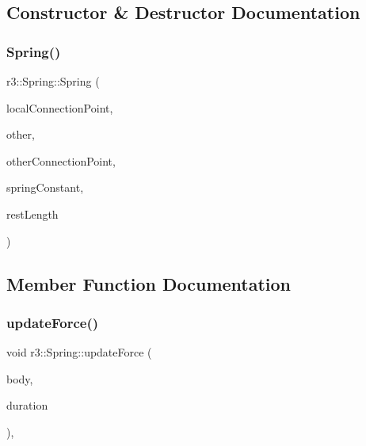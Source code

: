 \subsection{Constructor \& Destructor Documentation}
\mbox{\label{classr3_1_1_spring_ae96ec521b5609d2ace1476aec3c831f3}} 
\subsubsection{\texorpdfstring{Spring()}{Spring()}}
{\footnotesize\ttfamily r3\+::\+Spring\+::\+Spring (\begin{DoxyParamCaption}\item[{const glm\+::vec3 \&}]{local\+Connection\+Point,  }\item[{\mbox{\hyperlink{classr3_1_1_rigid_body}{Rigid\+Body}} $\ast$}]{other,  }\item[{const glm\+::vec3 \&}]{other\+Connection\+Point,  }\item[{\mbox{\hyperlink{namespacer3_ab2016b3e3f743fb735afce242f0dc1eb}{real}}}]{spring\+Constant,  }\item[{\mbox{\hyperlink{namespacer3_ab2016b3e3f743fb735afce242f0dc1eb}{real}}}]{rest\+Length }\end{DoxyParamCaption})}



\subsection{Member Function Documentation}
\mbox{\label{classr3_1_1_spring_a3305adfd568606ed9ae6fb589f20446b}} 
\subsubsection{\texorpdfstring{update\+Force()}{updateForce()}}
{\footnotesize\ttfamily void r3\+::\+Spring\+::update\+Force (\begin{DoxyParamCaption}\item[{\mbox{\hyperlink{classr3_1_1_rigid_body}{Rigid\+Body}} $\ast$}]{body,  }\item[{\mbox{\hyperlink{namespacer3_ab2016b3e3f743fb735afce242f0dc1eb}{real}}}]{duration }\end{DoxyParamCaption})\hspace{0.3cm}{\ttfamily [override]}, {\ttfamily [virtual]}}



